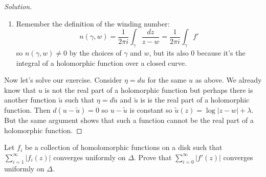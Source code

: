 \begin{proof}[Solution]
\begin{enumerate}[label=\textbf{Step \arabic*}]
	\item Remember the definition of the winding number:
	\[n(\gamma,w)=\frac{1}{2\pi i}\int_{\gamma}\frac{dz}{z-w}=\frac{1}{2\pi i}\int_{\gamma}f'\]
	so $n(\gamma,w)\neq0$ by the choices of $\gamma$ and $w$, but its also $0$ because it's the integral of a holomorphic function over a closed curve.
	\end{enumerate}



	Now let's solve our exercise. Consider $\eta=du$ for the same $u$ as above. We already know that $u$ is not the real part of a holomorphic function but perhaps there is another function  $\tilde{u}$ such that $\eta= d\tilde{u}$ and $\tilde{u}$ is is the real part of a holomorphic function. Then $d(u-\tilde{u})=0$ so  $u-\tilde{u}$ is constant so $\tilde{u}(z)=\log|z-w|+\lambda$. But the same argument shows that such a function cannot be the real part of a holomorphic function.
\end{proof}

\begin{manualexercise}{2.7}
	Let $f_{i}$ be a collection of homolomorphic functions on a disk such that $\sum_{i=1}^{\infty} |f_{i}(z)|$ converges uniformly on $\Delta$. Prove that $\sum_{i=0}^{\infty}|f'(z)|$ converges uniformly on $\Delta$.
\end{manualexercise}

